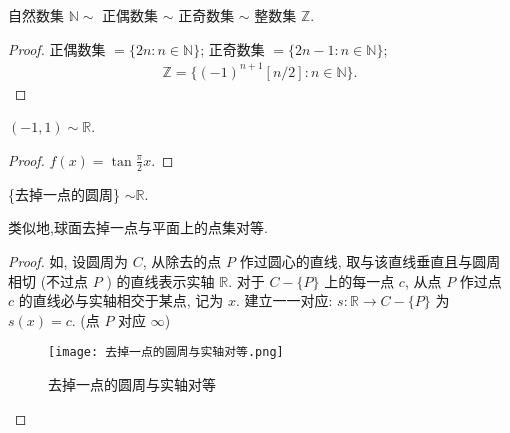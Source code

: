\documentclass[../../main.tex]{subfiles}
\begin{document}
\begin{example}
自然数集 $\mathbb{N} \sim$ 正偶数集 $\sim$ 正奇数集 $\sim$ 整数集 $\mathbb{Z}$.
\end{example}
\begin{proof}
正偶数集 $= \{2n : n \in \mathbb{N}\}$; 正奇数集 $= \{2n - 1 : n \in \mathbb{N}\}$;
\begin{align*}
\mathbb{Z} = \{(-1)^{n + 1}[n/2] : n \in \mathbb{N}\}.
\end{align*}
\end{proof}

\begin{example}\label{example-214234210.2}
$(-1, 1) \sim \mathbb{R}$.
\end{example}
\begin{proof}
$f(x) = \tan \frac{\pi}{2}x$.
\end{proof}

\begin{example}
\{去掉一点的圆周\} $\sim \mathbb{R}$.
\end{example}
\begin{note}
类似地,球面去掉一点与平面上的点集对等.
\end{note}
\begin{proof}
如, 设圆周为 $C$, 从除去的点 $P$ 作过圆心的直线, 取与该直线垂直且与圆周相切 (不过点 $P$ ) 的直线表示实轴 $\mathbb{R}$. 对于 $C - \{P\}$ 上的每一点 $c$, 从点 $P$ 作过点 $c$ 的直线必与实轴相交于某点, 记为 $x$. 建立一一对应: $s : \mathbb{R} \to C - \{P\}$ 为 $s(x) = c$. (点 $P$ 对应 $\infty$) 
\begin{figure}[H]
\centering
\texttt{[image: 去掉一点的圆周与实轴对等.png]}
\caption{去掉一点的圆周与实轴对等}
\label{figure:去掉一点的圆周与实轴对等}
\end{figure}
\end{proof}
\end{document}
